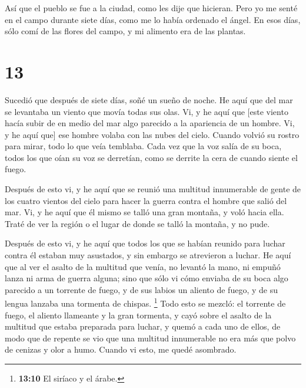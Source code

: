  Así que el pueblo se fue a la ciudad, como les dije que
hicieran.  Pero yo me senté en el campo durante siete
días, como me lo había ordenado el ángel. En esos días, sólo comí de las
flores del campo, y mi alimento era de las plantas.

\hypertarget{section-12}{%
\section{13}\label{section-12}}

 Sucedió que después de siete días, soñé un sueño de
noche.  He aquí que del mar se levantaba un viento que
movía todas sus olas.  Vi, y he aquí que {[}este viento
hacía subir de en medio del mar algo parecido a la apariencia de un
hombre. Vi, y he aquí que{]} ese hombre volaba con las nubes del cielo.
Cuando volvió su rostro para mirar, todo lo que veía temblaba.
 Cada vez que la voz salía de su boca, todos los que oían
su voz se derretían, como se derrite la cera de cuando siente el fuego.

 Después de esto vi, y he aquí que se reunió una multitud
innumerable de gente de los cuatro vientos del cielo para hacer la
guerra contra el hombre que salió del mar.  Vi, y he aquí
que él mismo se talló una gran montaña, y voló hacia ella.
 Traté de ver la región o el lugar de donde se talló la
montaña, y no pude.

 Después de esto vi, y he aquí que todos los que se habían
reunido para luchar contra él estaban muy asustados, y sin embargo se
atrevieron a luchar.  He aquí que al ver el asalto de la
multitud que venía, no levantó la mano, ni empuñó lanza ni arma de
guerra alguna;  sino que sólo vi cómo enviaba de su boca
algo parecido a un torrente de fuego, y de sus labios un aliento de
fuego, y de su lengua lanzaba una tormenta de chispas. \footnote{\textbf{13:10}
  El siríaco y el árabe.}  Todo esto se mezcló: el
torrente de fuego, el aliento llameante y la gran tormenta, y cayó sobre
el asalto de la multitud que estaba preparada para luchar, y quemó a
cada uno de ellos, de modo que de repente se vio que una multitud
innumerable no era más que polvo de cenizas y olor a humo. Cuando vi
esto, me quedé asombrado.

